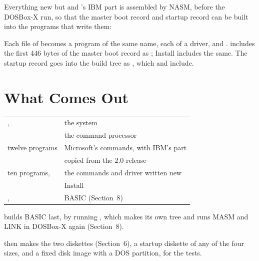 Everything new but  and 's IBM part is
assembled by NASM, before the DOSBox-X run, so that the master boot record
and startup record can be built into the programs that write them:


Each file of  becomes a  program of the same name,
each of  a  driver, and 
.  includes the first 446 bytes of the
master boot record as ; Install includes the same. The
startup record goes into the build tree as , which
 and  include.

\section{What Comes Out}

\begin{tabularx}{\textwidth}{@{}P{1.6in}Y@{}}
\toprule
{},  & the system\\
 & the command processor\\
twelve programs & Microsoft's commands,  with IBM's part\\
 & copied from the 2.0 release\\
ten programs,  & the commands and driver written new\\
 & Install\\
,  & BASIC (Section~8)\\
\bottomrule
\end{tabularx}

 builds BASIC last, by running
, which makes its own tree and runs MASM and
LINK in DOSBox-X again (Section~8).

 then makes the two diskettes (Section~6),
 a startup diskette of any of the four sizes, and
 a fixed disk image with a DOS partition, for the
tests.
